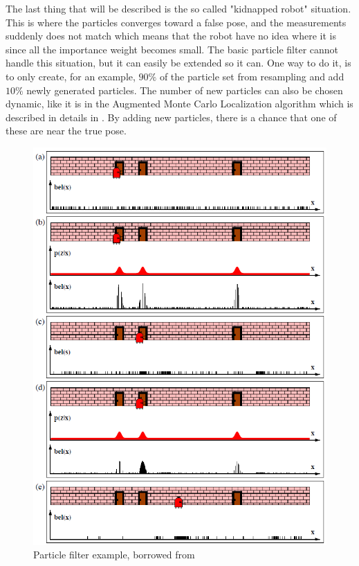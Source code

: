 \documentclass[Main]{subfiles}
\begin{document}
The last thing that will be described is the so called "kidnapped robot" situation.
This is where the particles converges toward a false pose, and the measurements suddenly does not match which means that the robot have no idea where it is since all the importance weight becomes small.
The basic particle filter cannot handle this situation, but it can easily be extended so it can.
One way to do it, is to only create, for an example, $90\%$ of the particle set from resampling and add $10\%$ newly generated particles.
The number of new particles can also be chosen dynamic, like it is in the Augmented Monte Carlo Localization algorithm which is described in details in \citep{Thrun2002}.
By adding new particles, there is a chance that one of these are near the true pose.
\begin{figure}[H]
	\centering
	\includegraphics[width=0.8\linewidth]{./Figures/pf_ex.png}
	\caption{Particle filter example, borrowed from \citep{Thrun2002}}
	\label{fig:pf_ex}
\end{figure}\noindent
\end{document}

